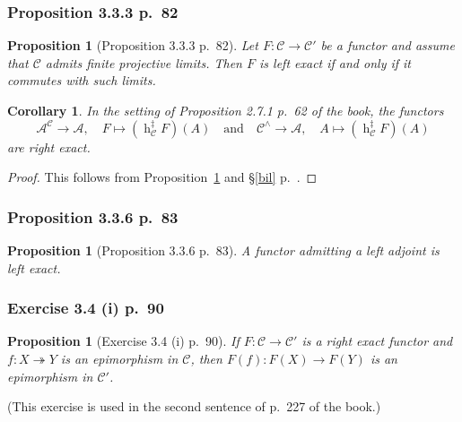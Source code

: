\documentclass[12pt]{article}%
\newtheorem{prop}[thm]{Proposition}
\newtheorem{cor}[thm]{Corollary}
\theoremstyle{remark}
\theoremstyle{definition}
\newcommand{\oo}{\operatorname}
\newcommand{\A}{\mathcal A}
\newcommand{\C}{\mathcal C}
\newcommand{\epi}{\twoheadrightarrow}
\begin{document}
\subsubsection{Proposition 3.3.3 p.~82}

\begin{prop}[Proposition 3.3.3 p.~82]\label{333}
Let $F:\C\to\C'$ be a functor and assume that $\C$ admits finite projective limits. Then $F$ is left exact if and only if it commutes with such limits.
\end{prop}

\begin{cor}\label{bre}
In the setting of Proposition 2.7.1 p.~62 of the book, the functors
$$
\A^\C\to\A,\quad F\mapsto(\oo h_\C^\ddagger F)(A)\quad\text{and}\quad
\C^\wedge\to\A,\quad A\mapsto(\oo h_\C^\ddagger F)(A)
$$ 
are right exact. 
\end{cor}

\begin{proof}
This follows from Proposition~\ref{333} and \S\ref{bil} p.~\pageref{bil}.
\end{proof}

\subsubsection{Proposition 3.3.6 p.~83}

\begin{prop}[Proposition 3.3.6 p.~83]\label{336}
A functor admitting a left adjoint is left exact.
\end{prop}

\subsubsection{Exercise 3.4 (i) p.~90}

\begin{prop}[Exercise 3.4 (i) p.~90]\label{34i}
If $F:\C\to\C'$ is a right exact functor and $f:X\epi Y$ is an epimorphism in $\C$, then $F(f):F(X)\to F(Y)$ is an epimorphism in $\C'$.
\end{prop}

(This exercise is used in the second sentence of p.~227 of the book.)
\end{document}

